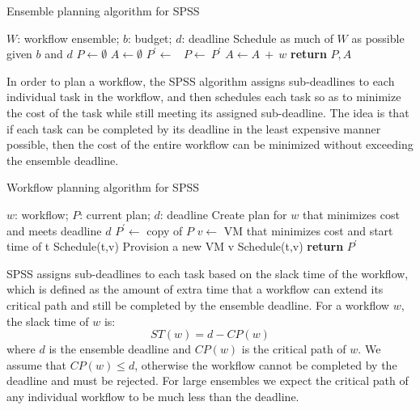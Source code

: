\documentclass[conference]{IEEEtran}
\begin{document}
\begin{algorithm}[tb]
\caption{Ensemble planning algorithm for SPSS}
\label{alg:admit}
{\small
\begin{algorithmic}[1]
\Require $W$: workflow ensemble; $b$: budget; $d$: deadline
\Ensure Schedule as much of $W$ as possible given $b$ and $d$
    \State $P\gets \emptyset$ 
    \State $A\gets \emptyset$ 
        \State $P^\prime \gets$\ 
            \State $P\gets\ P^\prime$ 
            \State $A \gets A\ +\ w$ 
        \EndIf
    \EndFor
    \State \textbf{return} $P,A$
\EndProcedure
\end{algorithmic}
}
\end{algorithm}

In order to plan a workflow, the SPSS algorithm assigns sub-deadlines to each individual task in the workflow, and then schedules each task so as to minimize the cost of the task while still meeting its assigned sub-deadline. The idea is that if each task can be completed by its deadline in the least expensive manner possible, then the cost of the entire workflow can be minimized without exceeding the ensemble deadline.

\begin{algorithm}[tb]
\caption{Workflow planning algorithm for SPSS}
\label{alg:planworkflow}
{\small
\begin{algorithmic}[1]
\Require $w$: workflow; $P$: current plan; $d$: deadline
\Ensure Create plan for $w$ that minimizes cost and meets deadline $d$
    \State $P^\prime\gets$ copy of $P$
    \State {}
        \State $v \gets$ VM that minimizes cost and start time of t
            \State Schedule(t,v)
        \Else
            \State Provision a new VM v
            \State Schedule(t,v)
        \EndIf
    \EndFor
    \State \textbf{return} $P^\prime$
\EndProcedure
\end{algorithmic}
}
\end{algorithm}

SPSS assigns sub-deadlines to each task based on the slack time of the workflow, which is defined as the amount of extra time that a workflow can extend its critical path and still be completed by the ensemble deadline. For a workflow $w$, the slack time of $w$ is:
%
$$
ST(w) = d - CP(w)
$$
%
where $d$ is the ensemble deadline and $CP(w)$ is the critical path of $w$. We assume that $CP(w) \leq d$, otherwise the workflow cannot be completed by the deadline and must be rejected. For large ensembles we expect the critical path of any individual workflow to be much less than the deadline.
\end{document}
